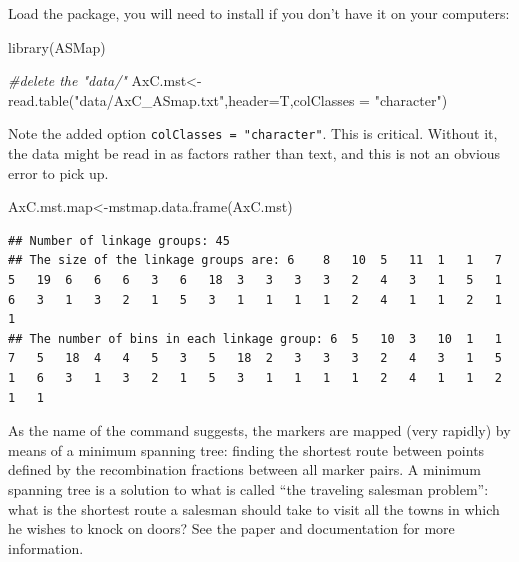 \documentclass[
]{book}
\newenvironment{Shaded}{\begin{snugshade}}{\end{snugshade}}
\newcommand{\AttributeTok}[1]{\textcolor[rgb]{0.77,0.63,0.00}{#1}}
\newcommand{\CommentTok}[1]{\textcolor[rgb]{0.56,0.35,0.01}{\textit{#1}}}
\newcommand{\FunctionTok}[1]{\textcolor[rgb]{0.00,0.00,0.00}{#1}}
\newcommand{\NormalTok}[1]{#1}
\newcommand{\OtherTok}[1]{\textcolor[rgb]{0.56,0.35,0.01}{#1}}
\newcommand{\StringTok}[1]{\textcolor[rgb]{0.31,0.60,0.02}{#1}}
\begin{document}
Load the package, you will need to install if you don't have it on your computers:

\begin{Shaded}
\begin{Highlighting}[]
\FunctionTok{library}\NormalTok{(ASMap)}
\end{Highlighting}
\end{Shaded}

\begin{Shaded}
\begin{Highlighting}[]
\CommentTok{\#delete the "data/"}
\NormalTok{AxC.mst}\OtherTok{\textless{}{-}}\FunctionTok{read.table}\NormalTok{(}\StringTok{"data/AxC\_ASmap.txt"}\NormalTok{,}\AttributeTok{header=}\NormalTok{T,}\AttributeTok{colClasses =} \StringTok{"character"}\NormalTok{) }
\end{Highlighting}
\end{Shaded}

Note the added option \texttt{colClasses\ =\ "character"}. This is critical. Without it, the data might be read in as factors rather than text, and this is not an obvious error to pick up.

\begin{Shaded}
\begin{Highlighting}[]
\NormalTok{AxC.mst.map}\OtherTok{\textless{}{-}}\FunctionTok{mstmap.data.frame}\NormalTok{(AxC.mst)}
\end{Highlighting}
\end{Shaded}

\begin{verbatim}
## Number of linkage groups: 45
## The size of the linkage groups are: 6    8   10  5   11  1   1   7   5   19  6   6   6   3   6   18  3   3   3   3   2   4   3   1   5   1   6   3   1   3   2   1   5   3   1   1   1   1   2   4   1   1   2   1   1   
## The number of bins in each linkage group: 6  5   10  3   10  1   1   7   5   18  4   4   5   3   5   18  2   3   3   3   2   4   3   1   5   1   6   3   1   3   2   1   5   3   1   1   1   1   2   4   1   1   2   1   1   
\end{verbatim}

As the name of the command suggests, the markers are mapped (very rapidly) by means of a minimum spanning tree: finding the shortest route between points defined by the recombination fractions between all marker pairs. A minimum spanning tree is a solution to what is called ``the traveling salesman problem'': what is the shortest route a salesman should take to visit all the towns in which he wishes to knock on doors? See the paper and documentation for more information.
\end{document}
